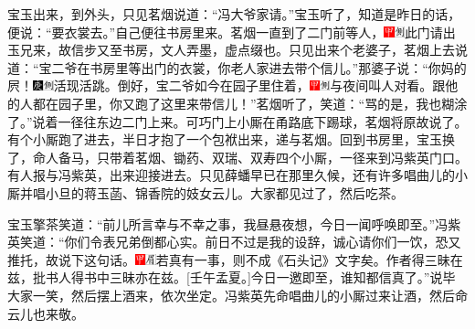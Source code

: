 宝玉出来，到外头，只见茗烟说道：``冯大爷家请。''宝玉听了，知道是昨日的话，便说：``要衣裳去。''自己便往书房里来。茗烟一直到了二门前等人，{\includegraphics[width=3mm]{../Images/00002}\includegraphics[width=3mm]{../Images/00011}\footnotesize \kaishu 此门请出玉兄来，故信步又至书房，文人弄墨，虚点缀也。}只见出来个老婆子，茗烟上去说道：``宝二爷在书房里等出门的衣裳，你老人家进去带个信儿。''那婆子说：``你妈的屄！{\includegraphics[width=3mm]{../Images/00004}\includegraphics[width=3mm]{../Images/00011}\footnotesize \kaishu 活现活跳。}倒好，宝二爷如今在园子里住着，{\includegraphics[width=3mm]{../Images/00002}\includegraphics[width=3mm]{../Images/00011}\footnotesize \kaishu 与夜间叫人对看。}跟他的人都在园子里，你又跑了这里来带信儿！''茗烟听了，笑道：``骂的是，我也糊涂了。''说着一径往东边二门上来。可巧门上小厮在甬路底下踢球，茗烟将原故说了。有个小厮跑了进去，半日才抱了一个包袱出来，递与茗烟。回到书房里，宝玉换了，命人备马，只带着茗烟、锄药、双瑞、双寿四个小厮，一径来到冯紫英门口。有人报与冯紫英，出来迎接进去。只见薛蟠早已在那里久候，还有许多唱曲儿的小厮并唱小旦的蒋玉菡、锦香院的妓女云儿。大家都见过了，然后吃茶。

宝玉擎茶笑道：``前儿所言幸与不幸之事，我昼悬夜想，今日一闻呼唤即至。''冯紫英笑道：``你们令表兄弟倒都心实。前日不过是我的设辞，诚心请你们一饮，恐又推托，故说下这句话。{\includegraphics[width=3mm]{../Images/00002}\includegraphics[width=3mm]{../Images/00010}\footnotesize \kaishu 若真有一事，则不成《石头记》文字矣。作者得三昧在兹，批书人得书中三昧亦在兹。{[}壬午孟夏。{]}}今日一邀即至，谁知都信真了。''说毕大家一笑，然后摆上酒来，依次坐定。冯紫英先命唱曲儿的小厮过来让酒，然后命云儿也来敬。

